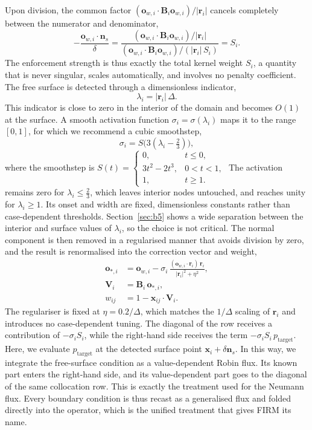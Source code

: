 \documentclass[preprint,review,12pt]{elsarticle}
\newcommand{\xij}{\mathbf{x}_{ij}}
\newcommand{\Bi}{\mathbf{B}_i}
\newcommand{\ow}{\mathbf{o}_{w,i}}
\newcommand{\ri}{\mathbf{r}_i}
\newcommand{\Vi}{\mathbf{V}_i}
\newcommand{\ns}{\mathbf{n}_s}
\begin{document}
Upon division, the common factor $(\ow\cdot\Bi\ow)/|\ri|$ cancels completely between the numerator and denominator,
\begin{equation}
  -\frac{\ow\cdot\ns}{\delta}
  =\frac{(\ow\cdot\Bi\ow)/|\ri|}{(\ow\cdot\Bi\ow)/(|\ri|\,S_i)}
  =S_i.
  \label{eq:cancel}
\end{equation}
The enforcement strength is thus exactly the total kernel weight $S_i$, a quantity that is never singular, scales automatically, and involves no penalty coefficient.
The free surface is detected through a dimensionless indicator,
\begin{equation}
  \lambda_i=|\ri|\,\Delta.
  \label{eq:lambda}
\end{equation}
This indicator is close to zero in the interior of the domain and becomes $O(1)$ at the surface.
A smooth activation function $\sigma_i=\sigma(\lambda_i)$ maps it to the range $[0, 1]$, for which we recommend a cubic smoothstep,
\begin{equation}
  \sigma_i=S\!\big(3(\lambda_i-\tfrac23)\big),
  \label{eq:smoothstep}
\end{equation}
where the smoothstep is $S(t)=\begin{cases}0,&t\le0,\\ 3t^2-2t^3,&0<t<1,\\ 1,&t\ge1.\end{cases}$
The activation remains zero for $\lambda_i\le\tfrac23$, which leaves interior nodes untouched, and reaches unity for $\lambda_i\ge1$.
Its onset and width are fixed, dimensionless constants rather than case-dependent thresholds.
Section~\ref{sec:b5} shows a wide separation between the interior and surface values of $\lambda_i$, so the choice is not critical.
The normal component is then removed in a regularised manner that avoids division by zero, and the result is renormalised into the correction vector and weight,
\begin{align}
  \mathbf o_{*,i} &= \ow-\sigma_i\,\frac{(\ow\cdot\ri)\,\ri}{|\ri|^2+\eta^2}, \label{eq:ostar}\\
  \Vi &= \Bi\,\mathbf o_{*,i}, \label{eq:Vsurf}\\
  w_{ij} &= 1-\xij\cdot\Vi. \label{eq:wsurf}
\end{align}
The regulariser is fixed at $\eta=0.2/\Delta$, which matches the $1/\Delta$ scaling of $\ri$ and introduces no case-dependent tuning.
The diagonal of the row receives a contribution of $-\sigma_i S_i$, while the right-hand side receives the term $-\sigma_i S_i\,p_{\mathrm{target}}$.
Here, we evaluate $p_{\mathrm{target}}$ at the detected surface point $\mathbf x_i+\delta\ns$.
In this way, we integrate the free-surface condition as a value-dependent Robin flux.
Its known part enters the right-hand side, and its value-dependent part goes to the diagonal of the same collocation row.
This is exactly the treatment used for the Neumann flux.
Every boundary condition is thus recast as a generalised flux and folded directly into the operator, which is the unified treatment that gives FIRM its name.
\end{document}
